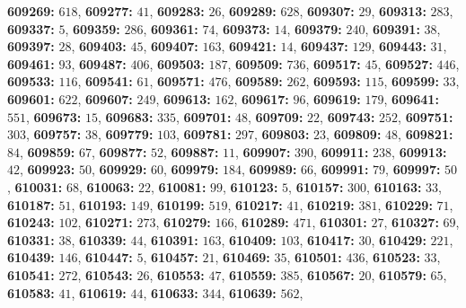 \textsf{\bfseries 609269:} $618$, \textsf{\bfseries 609277:} $41$, \textsf{\bfseries 609283:} $26$, \textsf{\bfseries 609289:} $628$, \textsf{\bfseries 609307:} $29$, \textsf{\bfseries 609313:} $283$, \textsf{\bfseries 609337:} $5$, \textsf{\bfseries 609359:} $286$, \textsf{\bfseries 609361:} $74$, \textsf{\bfseries 609373:} $14$, \textsf{\bfseries 609379:} $240$, \textsf{\bfseries 609391:} $38$, \textsf{\bfseries 609397:} $28$, \textsf{\bfseries 609403:} $45$, \textsf{\bfseries 609407:} $163$, \textsf{\bfseries 609421:} $14$, \textsf{\bfseries 609437:} $129$, \textsf{\bfseries 609443:} $31$, \textsf{\bfseries 609461:} $93$, \textsf{\bfseries 609487:} $406$, \textsf{\bfseries 609503:} $187$, \textsf{\bfseries 609509:} $736$, \textsf{\bfseries 609517:} $45$, \textsf{\bfseries 609527:} $446$, \textsf{\bfseries 609533:} $116$, \textsf{\bfseries 609541:} $61$, \textsf{\bfseries 609571:} $476$, \textsf{\bfseries 609589:} $262$, \textsf{\bfseries 609593:} $115$, \textsf{\bfseries 609599:} $33$, \textsf{\bfseries 609601:} $622$, \textsf{\bfseries 609607:} $249$, \textsf{\bfseries 609613:} $162$, \textsf{\bfseries 609617:} $96$, \textsf{\bfseries 609619:} $179$, \textsf{\bfseries 609641:} $551$, \textsf{\bfseries 609673:} $15$, \textsf{\bfseries 609683:} $335$, \textsf{\bfseries 609701:} $48$, \textsf{\bfseries 609709:} $22$, \textsf{\bfseries 609743:} $252$, \textsf{\bfseries 609751:} $303$, \textsf{\bfseries 609757:} $38$, \textsf{\bfseries 609779:} $103$, \textsf{\bfseries 609781:} $297$, \textsf{\bfseries 609803:} $23$, \textsf{\bfseries 609809:} $48$, \textsf{\bfseries 609821:} $84$, \textsf{\bfseries 609859:} $67$, \textsf{\bfseries 609877:} $52$, \textsf{\bfseries 609887:} $11$, \textsf{\bfseries 609907:} $390$, \textsf{\bfseries 609911:} $238$, \textsf{\bfseries 609913:} $42$, \textsf{\bfseries 609923:} $50$, \textsf{\bfseries 609929:} $60$, \textsf{\bfseries 609979:} $184$, \textsf{\bfseries 609989:} $66$, \textsf{\bfseries 609991:} $79$, \textsf{\bfseries 609997:} $50$, \textsf{\bfseries 610031:} $68$, \textsf{\bfseries 610063:} $22$, \textsf{\bfseries 610081:} $99$, \textsf{\bfseries 610123:} $5$, \textsf{\bfseries 610157:} $300$, \textsf{\bfseries 610163:} $33$, \textsf{\bfseries 610187:} $51$, \textsf{\bfseries 610193:} $149$, \textsf{\bfseries 610199:} $519$, \textsf{\bfseries 610217:} $41$, \textsf{\bfseries 610219:} $381$, \textsf{\bfseries 610229:} $71$, \textsf{\bfseries 610243:} $102$, \textsf{\bfseries 610271:} $273$, \textsf{\bfseries 610279:} $166$, \textsf{\bfseries 610289:} $471$, \textsf{\bfseries 610301:} $27$, \textsf{\bfseries 610327:} $69$, \textsf{\bfseries 610331:} $38$, \textsf{\bfseries 610339:} $44$, \textsf{\bfseries 610391:} $163$, \textsf{\bfseries 610409:} $103$, \textsf{\bfseries 610417:} $30$, \textsf{\bfseries 610429:} $221$, \textsf{\bfseries 610439:} $146$, \textsf{\bfseries 610447:} $5$, \textsf{\bfseries 610457:} $21$, \textsf{\bfseries 610469:} $35$, \textsf{\bfseries 610501:} $436$, \textsf{\bfseries 610523:} $33$, \textsf{\bfseries 610541:} $272$, \textsf{\bfseries 610543:} $26$, \textsf{\bfseries 610553:} $47$, \textsf{\bfseries 610559:} $385$, \textsf{\bfseries 610567:} $20$, \textsf{\bfseries 610579:} $65$, \textsf{\bfseries 610583:} $41$, \textsf{\bfseries 610619:} $44$, \textsf{\bfseries 610633:} $344$, \textsf{\bfseries 610639:} $562$, 
